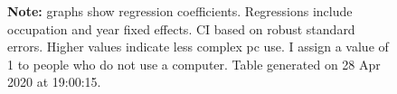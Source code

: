 \begin{figure}[!h]
\par \begin{minipage}[h]{\textwidth}{\scriptsize\textbf{Note:} graphs show regression coefficients. Regressions include occupation and year fixed effects. CI based on robust standard errors. Higher values indicate less complex pc use. I assign a value of 1 to people who do not use a computer. Table generated on 28 Apr 2020 at 19:00:15.}\end{minipage}
\end{figure}
